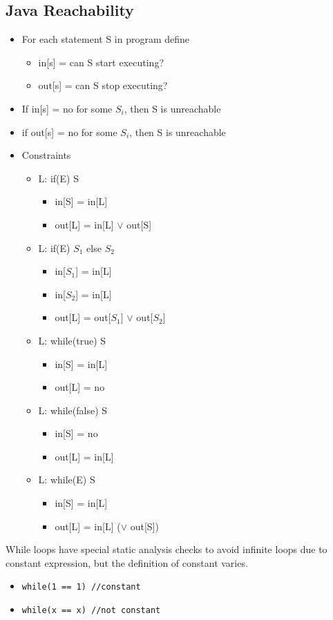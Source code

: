 \documentclass{article}
\newenvironment{ablock}[1]{%
    \tcolorbox[beamer,%
    noparskip,breakable,
    colback=lightcoral,colframe=darkred,%
    colbacklower=tomato!75!lightcoral,%
    title=#1]}%
    {\endtcolorbox}
\begin{document}
\subsection{Java Reachability}
\begin{itemize}
\item For each statement S in program define
\begin{itemize}
\item in[s] = can S start executing?
\item out[s] = can S stop executing?
\end{itemize}
\item If in[s] = no for some \(S_i\), then S is unreachable
\item if out[s] = no for some \(S_i\), then S is unreachable 
\item Constraints
\begin{itemize}
\item L: if(E) S
\begin{itemize}
\item in[S] = in[L]
\item out[L] = in[L] \(\vee\) out[S]
\end{itemize}
\item L: if(E) \(S_1\) else \(S_2\)
\begin{itemize}
\item in[\(S_1\)]  = in[L]
\item in[\(S_2\)] = in[L]
\item out[L]  = out[\(S_1\)] \(\vee\) out[\(S_2\)]
\end{itemize}
\item L: while(true) S
\begin{itemize}
\item in[S] = in[L]
\item out[L] = no
\end{itemize}
\item L: while(false) S
\begin{itemize}
\item in[S] = no
\item out[L] = in[L]
\end{itemize}
\item L: while(E) S
\begin{itemize}
\item in[S] = in[L]
\item out[L] = in[L] (\(\vee\) out[S])
\end{itemize}
\end{itemize}
\end{itemize}

\begin{ablock}{While Constant Expression Note (JLS 15.28)}
While loops have special static analysis checks to avoid infinite loops due to constant expression, but the definition of constant varies.
\begin{itemize}
\item \verb|while(1 == 1) //constant|
\item \verb|while(x == x) //not constant|
\end{itemize}
\end{ablock}
\end{document}
